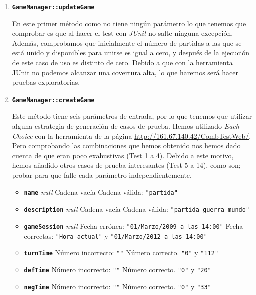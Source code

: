 \begin{enumerate}
\item \textbf{\texttt{GameManager::updateGame}}

En este primer método como no tiene ningún parámetro lo que tenemos que comprobar es que al hacer el test con \textit{JUnit} no salte ninguna excepción. Además, comprobamos que inicialmente el número de partidas a las que se está unido y disponibles para unirse es igual a cero, y después de la ejecución de este caso de uso es distinto de cero.
Debido a que con la herramienta JUnit no podemos alcanzar una covertura alta, lo que haremos será hacer pruebas exploratorias.

\item \textbf{\texttt{GameManager::createGame}}

Este método tiene seis parámetros de entrada, por lo que tenemos que utilizar alguna estrategia de generación de casos de prueba. Hemos utilizado \textit{Each Choice} con la herramienta de la página \url{http://161.67.140.42/CombTestWeb/}. Pero comprobando las combinaciones que hemos obtenido nos hemos dado cuenta de que eran poco exahustivas (Test 1 a 4). Debido a este motivo, hemos añadido otros casos de prueba interesantes (Test 5 a 14), como son; probar para que falle cada parámetro independientemente.

\begin{itemize}
\item \textbf{\texttt{name}}
\subitem \textit{null}
\subitem Cadena vacía
\subitem Cadena válida: \texttt{"partida"}

\item \textbf{\texttt{description}}
\subitem \textit{null}
\subitem Cadena vacía
\subitem Cadena válida: \texttt{"partida guerra mundo"}

\item \textbf{\texttt{gameSession}}
\subitem \textit{null}
\subitem Fecha errónea: \texttt{"01/Marzo/2009 a las 14:00"}
\subitem Fecha correctas: \texttt{"Hora actual"} y \texttt{"01/Marzo/2012 a las 14:00"}

\item \textbf{\texttt{turnTime}}
\subitem Número incorrecto: \texttt{""}
\subitem Número correcto. \texttt{"0"} y \texttt{"112"}

\item \textbf{\texttt{defTime}}
\subitem Número incorrecto: \texttt{""}
\subitem Número correcto. \texttt{"0"} y \texttt{"20"}

\item \textbf{\texttt{negTime}}
\subitem Número incorrecto: \texttt{""}
\subitem Número correcto. \texttt{"0"} y \texttt{"33"}
\end{itemize}


\end{enumerate}

